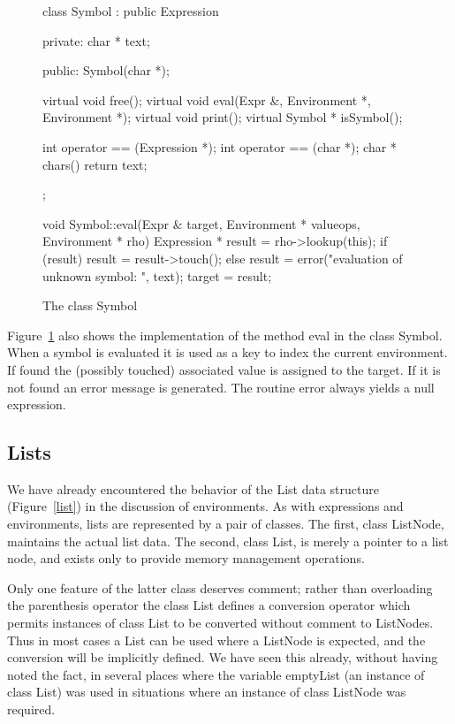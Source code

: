 \begin{figure}
\begin{cprog}
class Symbol : public Expression {
private:
	char * text;

public:
	Symbol(char *);

	virtual void free();
	virtual void eval(Expr &, Environment *, Environment *);
	virtual void print();
	virtual Symbol * isSymbol();

	int operator == (Expression *);
	int operator == (char *);
	char * chars() { return text; }
};

void Symbol::eval(Expr & target, Environment * valueops, Environment * rho)
{
	Expression * result = rho->lookup(this);
	if (result)
		result = result->touch();
	else
		result = error("evaluation of unknown symbol: ", text);
	target = result;
}
\end{cprog}
\caption{The class {\sf Symbol}}\label{symbol}
\end{figure}

Figure~\ref{symbol} also shows the implementation of the method {\sf eval}
in the class {\sf Symbol}.  When a symbol is evaluated it is used as a key
to index the current environment.  If found the (possibly touched)
associated value is assigned to the target.  If it is not found an error 
message is generated.   The routine {\sf error} always yields a null 
expression.

\subsection{Lists}\label{listsec}

We have already encountered the behavior of the List data structure
(Figure~\ref{list}) in the discussion of environments.
As with expressions and environments, lists are represented by a pair of
classes.  The first, class {\sf ListNode}, maintains the actual list data.
The second, class {\sf List}, is merely a pointer to a list node, and
exists only to provide memory management operations.

Only one feature of the latter class deserves comment; rather than
overloading the parenthesis operator the class {\sf List} defines a
conversion operator which permits instances of class {\sf List} to be
converted without comment to {\sf ListNodes}.  Thus in most cases a {\sf
List} can be used where a {\sf ListNode} is expected, and the conversion
will be implicitly defined.  We have seen this already, without having
noted the fact, in
several places where the variable {\sf emptyList} (an instance of class
{\sf List}) was used in situations where an instance of class {\sf
ListNode} was required.

